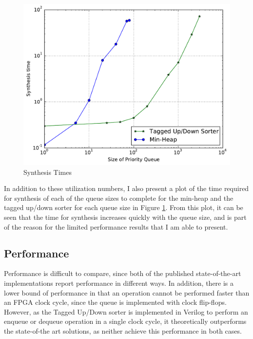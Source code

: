 \begin{figure}[t!]
	\centering
	\includegraphics[width=\columnwidth]{data/synthesis_times.pdf}
	\caption{Synthesis Times}
	\label{fig:synth_times}
\end{figure}

In addition to these utilization numbers, I also present a plot of the time required for synthesis of each of the queue sizes to complete for the min-heap and the tagged up/down sorter for each queue size in Figure \ref{fig:synth_times}. From this plot, it can be seen that the time for synthesis increases quickly with the queue size, and is part of the reason for the limited performance results that I am able to present.

\subsection{Performance}
Performance is difficult to compare, since both of the published state-of-the-art implementations report performance in different ways. In addition, there is a lower bound of performance in that an operation cannot be performed faster than an FPGA clock cycle, since the queue is implemented with clock flip-flops. However, as the Tagged Up/Down sorter is implemented in Verilog to perform an enqueue or dequeue operation in a single clock cycle, it theoretically outperforms the state-of-the art solutions, as neither achieve this performance in both cases.

\begin{table}[t!]
	\centering
	\small
	\caption{Performance Results}
	\label{tab:perf}
\end{table}




